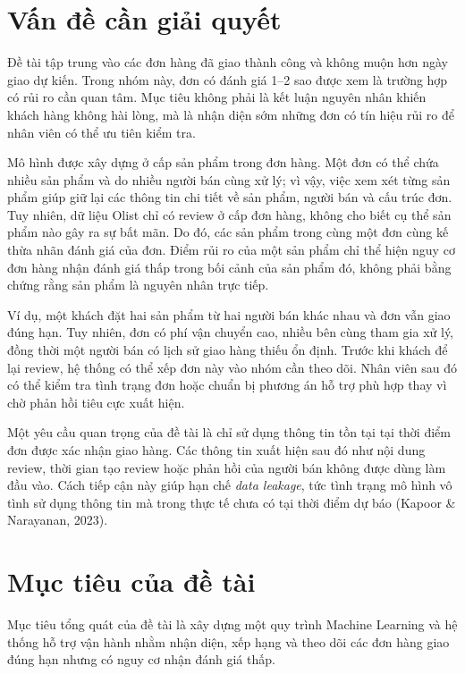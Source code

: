 \section{Vấn đề cần giải quyết}
\label{sec:van-de}

Đề tài tập trung vào các đơn hàng đã giao thành công và không muộn hơn ngày giao dự kiến. Trong nhóm này, đơn có đánh giá 1--2 sao được xem là trường hợp có rủi ro cần quan tâm. Mục tiêu không phải là kết luận nguyên nhân khiến khách hàng không hài lòng, mà là nhận diện sớm những đơn có tín hiệu rủi ro để nhân viên có thể ưu tiên kiểm tra.

Mô hình được xây dựng ở cấp sản phẩm trong đơn hàng. Một đơn có thể chứa nhiều sản phẩm và do nhiều người bán cùng xử lý; vì vậy, việc xem xét từng sản phẩm giúp giữ lại các thông tin chi tiết về sản phẩm, người bán và cấu trúc đơn. Tuy nhiên, dữ liệu Olist chỉ có review ở cấp đơn hàng, không cho biết cụ thể sản phẩm nào gây ra sự bất mãn. Do đó, các sản phẩm trong cùng một đơn cùng kế thừa nhãn đánh giá của đơn. Điểm rủi ro của một sản phẩm chỉ thể hiện nguy cơ đơn hàng nhận đánh giá thấp trong bối cảnh của sản phẩm đó, không phải bằng chứng rằng sản phẩm là nguyên nhân trực tiếp.

Ví dụ, một khách đặt hai sản phẩm từ hai người bán khác nhau và đơn vẫn giao đúng hạn. Tuy nhiên, đơn có phí vận chuyển cao, nhiều bên cùng tham gia xử lý, đồng thời một người bán có lịch sử giao hàng thiếu ổn định. Trước khi khách để lại review, hệ thống có thể xếp đơn này vào nhóm cần theo dõi. Nhân viên sau đó có thể kiểm tra tình trạng đơn hoặc chuẩn bị phương án hỗ trợ phù hợp thay vì chờ phản hồi tiêu cực xuất hiện.

Một yêu cầu quan trọng của đề tài là chỉ sử dụng thông tin tồn tại tại thời điểm đơn được xác nhận giao hàng. Các thông tin xuất hiện sau đó như nội dung review, thời gian tạo review hoặc phản hồi của người bán không được dùng làm đầu vào. Cách tiếp cận này giúp hạn chế \emph{data leakage}, tức tình trạng mô hình vô tình sử dụng thông tin mà trong thực tế chưa có tại thời điểm dự báo (Kapoor \& Narayanan, 2023).

\section{Mục tiêu của đề tài}
\label{sec:muc-tieu}

Mục tiêu tổng quát của đề tài là xây dựng một quy trình Machine Learning và hệ thống hỗ trợ vận hành nhằm nhận diện, xếp hạng và theo dõi các đơn hàng giao đúng hạn nhưng có nguy cơ nhận đánh giá thấp.

